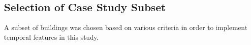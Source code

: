 \subsection{Selection of Case Study Subset}
\label{casestudysubset}

A subset of buildings was chosen based on various criteria in order to implement temporal features in this study.